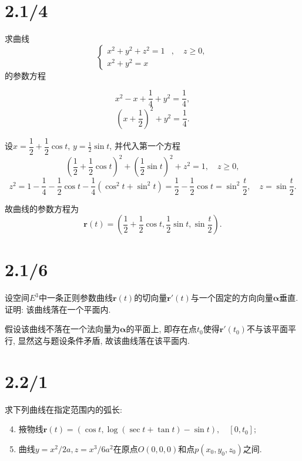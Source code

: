 \documentclass[11pt,a4paper]{article}
\author{刘逸灏 (515370910207)}
\begin{document}
\maketitle

\section{2.1/4}
\begin{problem}
  求曲线
  $$
    \left\{
    \begin{aligned}
      x^2+y^2+z^2=1 & ,\quad z\geqslant0, \\
      x^2+y^2=x     &
    \end{aligned}
    \right.
  $$
  的参数方程
\end{problem}

$$x^2-x+\frac{1}{4}+y^2=\frac{1}{4},$$
$$\left(x+\frac{1}{2}\right)^2+y^2=\frac{1}{4}.$$

设$x=\dfrac{1}{2}+\dfrac{1}{2}\cos t$, $y=\frac{1}{2}\sin t$, 并代入第一个方程
$$\left(\frac{1}{2}+\frac{1}{2}\cos t\right)^2+\left(\frac{1}{2}\sin t\right)^2+z^2=1,\quad z\geqslant0,$$
$$z^2=1-\frac{1}{4}-\frac{1}{2}\cos t-\frac{1}{4}(\cos^2t+\sin^2t)=\frac{1}{2}-\frac{1}{2}\cos t=\sin^2\frac{t}{2},\quad z=\sin\frac{t}{2}.$$

故曲线的参数方程为
$$\mathbf{r}(t)=\left(\frac{1}{2}+\frac{1}{2}\cos t,\frac{1}{2}\sin t,\sin\frac{t}{2}\right).$$

\section{2.1/6}
\begin{problem}
  设空间$E^3$中一条正则参数曲线$\mathbf{r}(t)$的切向量$\mathbf{r}'(t)$与一个固定的方向向量$\boldsymbol\alpha$垂直. 证明: 该曲线落在一个平面内.
\end{problem}

假设该曲线不落在一个法向量为$\boldsymbol\alpha$的平面上, 即存在点$t_0$使得$\mathbf{r}'(t_0)$不与该平面平行, 显然这与题设条件矛盾, 故该曲线落在该平面内.

\section{2.2/1}
\begin{problem}
  求下列曲线在指定范围内的弧长:
  \begin{enumerate}
    \setcounter{enumi}{3}
    \item 掖物线$\mathbf{r}(t)=(\cos t, \log(\sec t+\tan t)-\sin t),\quad [0,t_0];$
    \item 曲线$y=x^2/2a,z=x^3/6a^2$在原点$O(0,0,0)$和点$p(x_0,y_0,z_0)$之间.
  \end{enumerate}
\end{problem}
\end{document}
